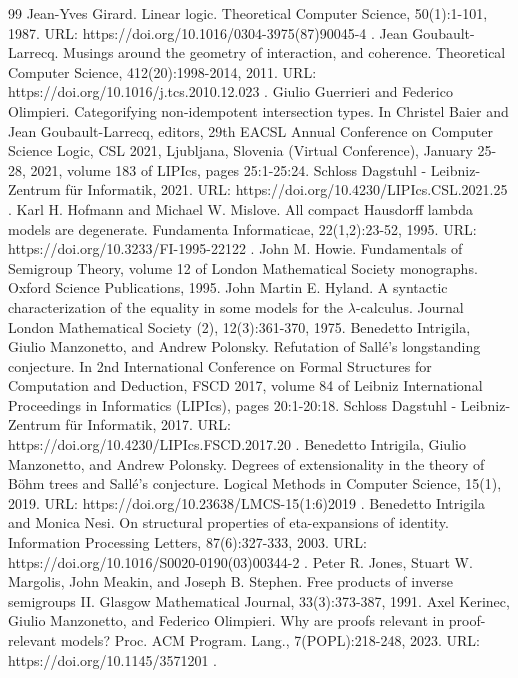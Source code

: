 \begin{thebibliography}{99}
 Jean-Yves Girard. Linear logic. Theoretical Computer Science, 50(1):1-101, 1987. URL: https://doi.org/10.1016/0304-3975(87)90045-4 .
 Jean Goubault-Larrecq. Musings around the geometry of interaction, and coherence. Theoretical Computer Science, 412(20):1998-2014, 2011. URL: https://doi.org/10.1016/j.tcs.2010.12.023 .
 Giulio Guerrieri and Federico Olimpieri. Categorifying non-idempotent intersection types. In Christel Baier and Jean Goubault-Larrecq, editors, 29th EACSL Annual Conference on Computer Science Logic, CSL 2021, Ljubljana, Slovenia (Virtual Conference), January 25-28, 2021, volume 183 of LIPIcs, pages 25:1-25:24. Schloss Dagstuhl - Leibniz-Zentrum für Informatik, 2021. URL: https://doi.org/10.4230/LIPIcs.CSL.2021.25 .
 Karl H. Hofmann and Michael W. Mislove. All compact Hausdorff lambda models are degenerate. Fundamenta Informaticae, 22(1,2):23-52, 1995. URL: https://doi.org/10.3233/FI-1995-22122 .
 John M. Howie. Fundamentals of Semigroup Theory, volume 12 of London Mathematical Society monographs. Oxford Science Publications, 1995.
 John Martin E. Hyland. A syntactic characterization of the equality in some models for the \ensuremath{\lambda}-calculus. Journal London Mathematical Society (2), 12(3):361-370, 1975.
 Benedetto Intrigila, Giulio Manzonetto, and Andrew Polonsky. Refutation of Sallé’s longstanding conjecture. In 2nd International Conference on Formal Structures for Computation and Deduction, FSCD 2017, volume 84 of Leibniz International Proceedings in Informatics (LIPIcs), pages 20:1-20:18. Schloss Dagstuhl - Leibniz-Zentrum für Informatik, 2017. URL: https://doi.org/10.4230/LIPIcs.FSCD.2017.20 .
 Benedetto Intrigila, Giulio Manzonetto, and Andrew Polonsky. Degrees of extensionality in the theory of Böhm trees and Sallé’s conjecture. Logical Methods in Computer Science, 15(1), 2019. URL: https://doi.org/10.23638/LMCS-15(1:6)2019 .
 Benedetto Intrigila and Monica Nesi. On structural properties of eta-expansions of identity. Information Processing Letters, 87(6):327-333, 2003. URL: https://doi.org/10.1016/S0020-0190(03)00344-2 .
 Peter R. Jones, Stuart W. Margolis, John Meakin, and Joseph B. Stephen. Free products of inverse semigroups II. Glasgow Mathematical Journal, 33(3):373-387, 1991.
 Axel Kerinec, Giulio Manzonetto, and Federico Olimpieri. Why are proofs relevant in proof-relevant models? Proc. ACM Program. Lang., 7(POPL):218-248, 2023. URL: https://doi.org/10.1145/3571201 .

\end{thebibliography}
